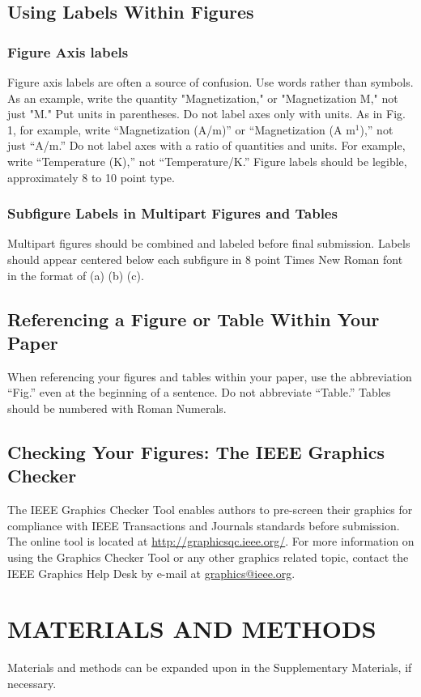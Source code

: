 \documentclass[journal]{IEEEtran}
\begin{document}
\subsection{Using Labels Within Figures}	
\subsubsection{Figure Axis labels}
Figure axis labels are often a source of confusion. Use words rather than symbols. As an example, write the quantity "Magnetization," or "Magnetization M," not just "M." Put units in parentheses. Do not label axes only with units. As in Fig. 1, for example, write “Magnetization (A/m)” or “Magnetization (A m$^1$),” not just “A/m.” Do not label axes with a ratio of quantities and units. For example, write “Temperature (K),” not “Temperature/K.” 
Figure labels should be legible, approximately 8 to 10 point type.\\

\subsubsection{Subfigure Labels in Multipart Figures and Tables}
Multipart figures should be combined and labeled before final submission. Labels should appear centered below each subfigure in 8 point Times New Roman font in the format of (a) (b) (c). 

\subsection{Referencing a Figure or Table Within Your Paper}
When referencing your figures and tables within your paper, use the abbreviation “Fig.” even at the beginning of a sentence. Do not abbreviate “Table.” Tables should be numbered with Roman Numerals.

\subsection{Checking Your Figures: The IEEE Graphics Checker}
The IEEE Graphics Checker Tool enables authors to pre-screen their graphics for compliance with IEEE Transactions and Journals standards before submission. The online tool is located at \underline{http://graphicsqc.ieee.org/}. For more information on using the Graphics Checker Tool 
or any other graphics related topic, contact the IEEE Graphics Help Desk by e-mail at \underline{graphics@ieee.org}.

\section{MATERIALS AND METHODS }	
Materials and methods can be expanded upon in the Supplementary Materials, if necessary.\\
\end{document}
